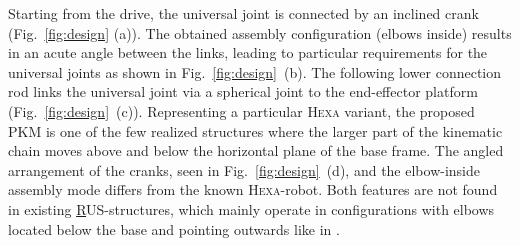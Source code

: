 \documentclass[runningheads]{llncs}
\begin{document}
Starting from the drive, the universal joint is connected by an inclined crank (Fig.~\ref{fig:design} (a)). 
The obtained assembly configuration (elbows inside) results in an acute angle between the links, leading 
to particular requirements for the universal joints as shown in Fig.~\ref{fig:design}~(b).
The following lower connection rod links the universal joint via a spherical joint to the end-effector platform (Fig.~\ref{fig:design}~(c)). 
Representing a particular \textsc{Hexa} variant, the proposed PKM is one of the few realized structures where the larger part of the kinematic chain moves above and below the horizontal plane of the base frame. 
The angled arrangement of the cranks, seen in Fig.~\ref{fig:design}~(d), and the elbow-inside assembly mode differs from the known \textsc{Hexa}-robot. 
Both features are not found in existing \underline{R}US-structures, which mainly operate in configurations with elbows located below the base and pointing outwards like in \cite{Frindt.2010}. 
\end{document}
